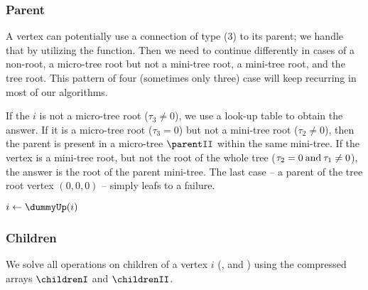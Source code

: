 \subsubsection{Parent}

A vertex can potentially use a connection of type (3) to its parent; we handle that by utilizing the \dummyUp{} function.
Then we need to continue differently in cases of a non-root, a micro-tree root but not a mini-tree root, a mini-tree root, and the tree root.
This pattern of four (sometimes only three) case will keep recurring in most of our algorithms.

If the $i$ is not a micro-tree root ($\tau_3 \ne 0$), we use a look-up table to obtain the answer.
If it is a micro-tree root ($\tau_3 = 0$) but not a mini-tree root ($\tau_2 \ne 0$), then the parent is present in a micro-tree $\parentII$ within the same mini-tree.
If the vertex is a mini-tree root, but not the root of the whole tree ($\tau_2 = 0 \mathbin{\textrm{and}} \tau_1 \ne 0$), the answer is the root of the parent mini-tree.
The last case -- a parent of the tree root vertex $(0, 0, 0)$ -- simply leafs to a failure.

\begin{algorithm}
\begin{algorithmic}
	\State $i \gets \dummyUp(i)$ 
	 
		\State {} 
	 
		\State {} 
	 
		\State {}
	\Else {}
		\State {}
	\EndIf
\EndFunction
\end{algorithmic}
\end{algorithm}

\subsubsection{Children}

We solve all operations on children of a vertex $i$ (\degree{}, \childRank{} and \childSelect{}) using the compressed arrays $\childrenI$ and $\childrenII$.

\begin{algorithm}
\begin{algorithmic}
		\State {}
		\State {}
	\Else
		\State {}
	\EndIf
\EndFunction
\end{algorithmic}
\end{algorithm}

